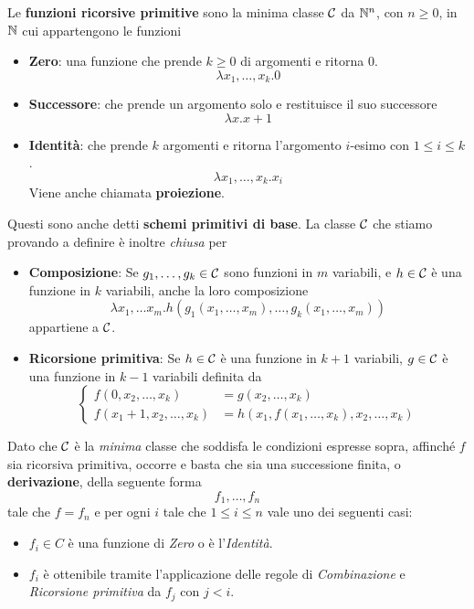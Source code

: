 \begin{definition} \label{def: ricorsive primitive}
	Le \textbf{funzioni ricorsive primitive} sono la minima
	classe $\mathcal{C}$ da $\mathbb{N}^n$, con $n \geq 0$, in $\mathbb{N}$ cui
	appartengono le funzioni
	\begin{itemize}
		\item \textbf{Zero}: una funzione che prende $k \geq 0$
		      di argomenti e ritorna 0.
		      \[ \lambda x_1, \dots, x_k . 0 \]
		\item \textbf{Successore}: che prende un argomento solo
		      e restituisce il suo successore
		      \[ \lambda x . x + 1 \]
		\item \textbf{Identità}: che prende $k$ argomenti e
		      ritorna l'argomento $i$-esimo con $1\leq i\leq k$.
		      \[ \lambda x_1, \dots, x_k . x_i \]
		      Viene anche chiamata \textbf{proiezione}.
	\end{itemize}
	Questi sono anche detti \textbf{schemi primitivi di base}.
	La classe $\mathcal{C}$ che stiamo provando a definire è inoltre
	\emph{chiusa} per
	\begin{itemize}
		\item \textbf{Composizione}: Se $g_1, \dots, g_k \in \mathcal{C}$
		      sono funzioni in $m$ variabili, e $h \in \mathcal{C}$ è
		      una funzione in $k$ variabili, anche la loro
		      composizione
		      \[
			      \lambda x_1, \dots x_m .
			      h(g_1(x_1, \dots, x_m), \dots,
			      g_k(x_1, \dots, x_m)
			      )
		      \]
		      appartiene a $\mathcal{C}$.
		\item \textbf{Ricorsione primitiva}: Se $h \in \mathcal{C}$
		      è una funzione in $k+1$ variabili, $g \in \mathcal{C}$
		      è una funzione in $k-1$ variabili definita da
		      \[
			      \begin{cases}
				      f(0, x_2, \dots, x_k)       & =
				      g(x_2, \dots, x_k)              \\
				      f(x_1 + 1, x_2, \dots, x_k) & =
				      h(x_1, f(x_1, \dots, x_k),
				      x_2, \dots, x_k)
			      \end{cases}
		      \]
	\end{itemize}
\end{definition}

\begin{tcolorbox}
	Dato che $\mathcal{C}$ è la \emph{minima} classe che soddisfa le
	condizioni espresse sopra, affinché $f$ sia ricorsiva
	primitiva, occorre e basta che sia una successione finita,
	o \textbf{derivazione}, della seguente forma
	\[ f_1, \dots, f_n \]
	tale che $f = f_n$ e per ogni $i$ tale che
	$1 \leq i \leq n$ vale uno dei seguenti casi:
	\begin{itemize}
		\item $f_i \in C$ è una funzione di \emph{Zero} o è
		      l'\emph{Identità}.
		\item $f_i$ è ottenibile tramite l'applicazione delle
		      regole di \emph{Combinazione} e
		      \emph{Ricorsione primitiva} da $f_j$ con $j < i$.
	\end{itemize}
\end{tcolorbox}

